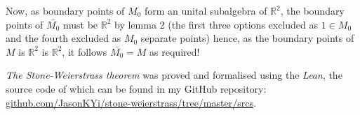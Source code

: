 \documentclass[landscape,final,a0paper]{baposter}
\begin{document}
\begin{poster}
{\vspace{2mm}
Now, as boundary points of $M_0$ form an unital subalgebra of $\mathbb{R}^2$, the boundary points of  $\bar{M_0}$ must be $\mathbb{R}^2$ by lemma 2 (the first three options excluded as $1 \in M_0$ and the fourth excluded as $M_0$ separate points) hence, as the boundary points of $M$ is $\mathbb{R}^2$ is $\mathbb{R}^2$, it follows $\bar{M_0} = M$ as required!

\vspace{2mm}
\textit{The Stone-Weierstrass theorem} was proved and formalised using the 
\textit{Lean}, the source code of which can be found 
in my GitHub repository:\\ \url{github.com/JasonKYi/stone-weierstrass/tree/master/srcs}. 

\vspace{0.2em}
  }
	
  
\end{poster}
\end{document}
